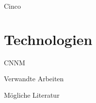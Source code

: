 \documentclass[12pt, pdf, xcolor={table, dvipsnames}, paperheight=8cm,paperwidth=12cm]{beamer}
\begin{document}
\begin{frame}{Cinco}
\end{frame}

\section{Technologien}
\begin{frame}{CNNM}
\end{frame}



\begin{frame}{Verwandte Arbeiten}
\end{frame}

\begin{frame}{Mögliche Literatur}
\end{frame}
\end{document}
